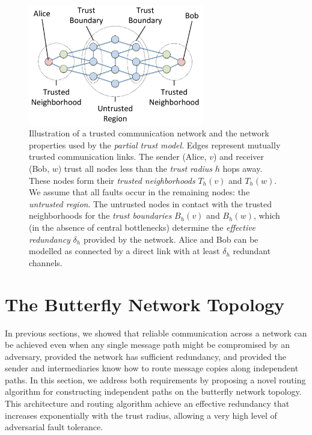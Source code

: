 \documentclass[sigconf]{acmart}
\begin{document}
\begin{figure}
\centerline{\includegraphics[width=3in,height=2.08in]{fig-partial-trust}}
\caption{
Illustration of a trusted communication network and the network properties
used by the {\em partial trust model}.
Edges represent mutually trusted communication links.
The sender (Alice, $v$) and receiver (Bob, $w$) trust all nodes
less than the {\em trust radius} $h$ hops away.
These nodes form their {\em trusted neighborhoods} $T_h(v)$ and $T_h(w)$.
We assume that all faults occur in the remaining nodes: the
{\em untrusted region}.
The untrusted nodes in contact with the trusted neighborhoods for the
{\em trust boundaries} $B_h(v)$ and $B_h(w)$,
which (in the absence of central bottlenecks) determine the
{\em effective redundancy} $\delta_h$ provided by the network.
Alice and Bob can be modelled as connected by a direct link with
at least $\delta_h$ redundant channels.
}
\label{fig:trust-source}
\end{figure}

\section{The Butterfly Network Topology}
\label{sec-butterfly}

In previous sections, we showed that reliable communication across a network
can be achieved even when any single message path might be compromised by
an adversary,
provided the network has sufficient redundancy,
and provided the sender and intermediaries know how to route message
copies along independent paths.
In this section, we address both requirements by proposing a novel routing
algorithm for constructing independent paths on the butterfly network topology.
This architecture and routing algorithm achieve an
effective redundancy that increases exponentially with the trust radius,
allowing a very high level of adversarial fault tolerance.
\end{document}
